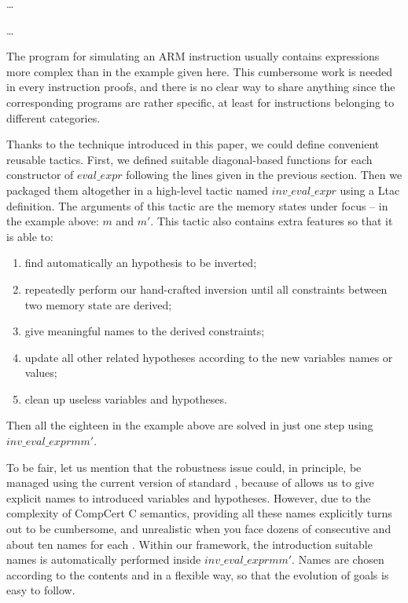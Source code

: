 \medskip
\dots \\

\dots
\medskip

The program for simulating an ARM instruction 
usually contains expressions more complex than in the
example given here.
This cumbersome work is needed in every instruction proofs,
and there is no clear way to share anything since
the corresponding programs are rather specific,
at least for instructions belonging to different categories.

Thanks to the technique introduced in this paper,
we could define convenient reusable tactics.
First, we defined suitable diagonal-based functions for each
constructor of $eval\_expr$ following the lines given in the
previous section.
Then we packaged them altogether in a high-level tactic named 
$inv\_eval\_expr$ using a Ltac definition. The arguments of this
tactic are the memory states under focus --
in the example above: $m$ and $m'$.
This tactic also contains extra features so that
it is able to:
%
\begin{enumerate}
\item find automatically an hypothesis to be inverted;
\item repeatedly perform our hand-crafted inversion until all constraints
  between two memory state are derived;
\item give meaningful names to the derived constraints;
\item update all other related hypotheses according to the new 
  variables names or values;
\item clean up useless variables and hypotheses.
\end{enumerate}
%
Then all the eighteen \inversion in the example above are solved in just
one step using $inv\_eval\_expr m m'$.

To be fair, let us mention that the robustness issue could,
in principle, be managed using the current version of standard \inversion,
because of allows us 
to give explicit names to introduced variables and hypotheses.
However, due to the complexity of CompCert C semantics, 
providing all these names explicitly turns out to be cumbersome,
and unrealistic when you face dozens of consecutive \inversion 
and about ten names for each \inversion.
Within our framework,
the introduction suitable names 
is automatically performed inside $inv\_eval\_expr m m'$.
Names are chosen according to the contents and in a flexible way, 
so that the evolution of goals is easy to follow.

